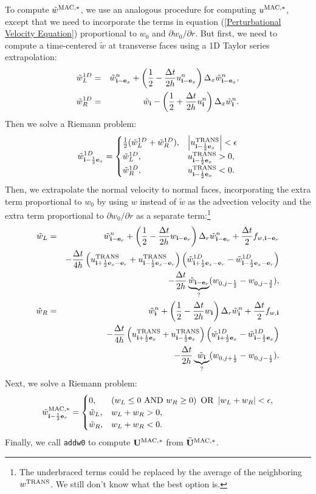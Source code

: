\documentclass[11pt]{article}
\def\half  {\frac{1}{2}}
\def\dt    {\Delta t}
\def\mac   {\rm MAC}
\def\trans {\rm TRANS}
\def\eb    {{\bf e}}
\def\ib    {{\bf i}}
\def\Ub    {{\bf U}}
\def\Ubt   {\widetilde{\bf U}}
\def\wt    {\tilde{w}}
\begin{document}
To compute $\wt^{\mac,*}$, we use an analogous procedure for computing $u^{\mac,*}$, except that we need to incorporate the terms in equation (\ref{Perturbational Velocity Equation}) proportional to $w_0$ and $\partial w_0/\partial r$.  But first, we need to compute a time-centered $\wt$ at transverse faces using a 1D Taylor series extrapolation:
\begin{eqnarray}
\wt_L^{1D} &=& \wt_{\ib-\eb_x}^n + \left(\half - \frac{\dt}{2h}u_{\ib-\eb_x}^n\right)\Delta_x \wt_{\ib-\eb_x}^n, \\
\wt_R^{1D} &=& \wt_{\ib} - \left(\half + \frac{\dt}{2h}u_{\ib}^n\right)\Delta_x \wt_{\ib}^n.
\end{eqnarray}
Then we solve a Riemann problem:
\begin{equation}
\wt_{\ib-\half\eb_x}^{1D} =
\begin{cases}
\half(\wt_L^{1D} + \wt_R^{1D}), & \left|u^{\trans}_{\ib-\half\eb_x}\right| < \epsilon \\
\wt_L^{1D}, & u^{\trans}_{\ib-\half\eb_x} > 0, \\
\wt_R^{1D}, & u^{\trans}_{\ib-\half\eb_x} < 0. \\
\end{cases}
\end{equation}
Then, we extrapolate the normal velocity to normal faces, incorporating the extra term proportional to $w_0$ by using $w$ instead of $\wt$ as the advection velocity and the extra term proportional to $\partial w_0/\partial r$ as a separate term:\footnote{The underbraced terms could be replaced by the average of the neighboring $w^{\trans}$.  We still don't know what the best option is.}
\begin{eqnarray}
\wt_L &=& \wt_{\ib-\eb_r}^n + \left(\half - \frac{\dt}{2h}w_{\ib-\eb_r}\right)\Delta_r \wt_{\ib-\eb_r}^n + \frac{\dt}{2}f_{w,\ib-\eb_r} \nonumber \\
&& - \frac{\dt}{4h}\left(u_{\ib+\half\eb_x-\eb_r}^{\trans}+u_{\ib-\half\eb_x-\eb_r}^{\trans}\right)\left(\wt_{\ib+\half\eb_x-\eb_r}^{1D} - \wt_{\ib-\half\eb_x-\eb_r}^{1D}\right) \nonumber \\
&& - \frac{\dt}{2h}\underbrace{\wt_{\ib-\eb_r}}_{?}(w_{0,j-\half} - w_{0,j-\frac{3}{2}}), \\
\wt_R &=& \wt_{\ib}^n + \left(\half - \frac{\dt}{2h}w_{\ib}\right)\Delta_r \wt_{\ib}^n + \frac{\dt}{2}f_{w,\ib} \nonumber \\
&& - \frac{\dt}{4h}\left(u_{\ib+\half\eb_x}^{\trans}+u_{\ib-\half\eb_x}^{\trans}\right)\left(\wt_{\ib+\half\eb_x}^{1D} - \wt_{\ib-\half\eb_x}^{1D}\right) \nonumber \\
&& - \frac{\dt}{2h}\underbrace{\wt_{\ib}}_{?}(w_{0,j+\half} - w_{0,j-\half}).
\end{eqnarray}
Next, we solve a Riemann problem:
\begin{equation}
\wt_{\ib-\half\eb_r}^{\mac,*} =
\begin{cases}
0, & \left(w_L \le 0 ~ {\rm AND} ~ w_R \ge 0\right) ~ {\rm OR} ~ \left|w_L + w_R\right| < \epsilon, \\
\wt_L, & w_L + w_R > 0, \\
\wt_R, & w_L + w_R < 0. 
\end{cases}
\end{equation}
Finally, we call {\tt addw0} to compute $\Ub^{\mac,*}$ from $\Ubt^{\mac,*}$.
\end{document}
